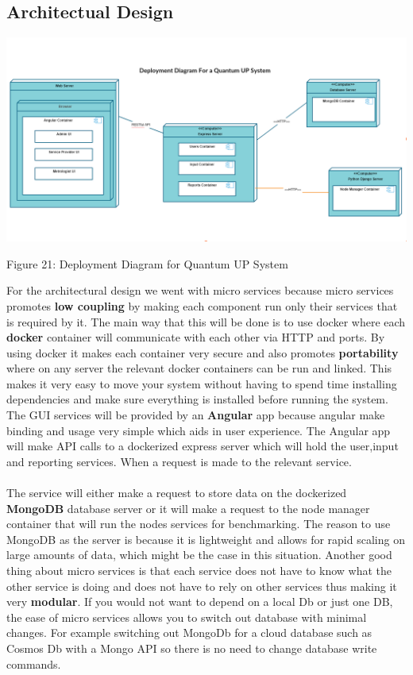 \subsection{Architectual Design}
\includegraphics[width=\textwidth]{deployment_diagram/Quantum_UP_Deployment_Diagram.png}
    \begin{center}
    	\small{Figure 21: Deployment Diagram for Quantum UP System}
    \end{center}

For the architectural design we went with micro services because micro services promotes \textbf{low coupling} by making each component run only their services that is required by it. The main way that this will be done is to use docker where each \textbf{docker} container will communicate with each other via HTTP and ports. By using docker it makes each container very secure and also promotes \textbf{portability} where on any server the relevant docker containers can be run and linked. This makes it very easy to move your system without having to spend time installing dependencies and make sure everything is installed before running the system. The GUI services will be provided by an \textbf{Angular} app because angular make binding and usage very simple which aids in user experience. The Angular app will make API calls to a dockerized express server which will hold the user,input and reporting services. When a request is made to the relevant service.\\ \\ 

The service will either make a request to store data on the dockerized \textbf{MongoDB} database server or it will make a request to the node manager container that will run the nodes services for benchmarking. The reason to use MongoDB as the server is because it is lightweight and allows for rapid scaling on large amounts of data, which might be the case in this situation. Another good thing about micro services is that each service does not have to know what the other service is doing and does not have to rely on other services thus making it very \textbf{modular}. If you would not want to depend on a local Db or just one DB, the ease of micro services allows you to switch out database with minimal changes. For example switching out MongoDb for a cloud database such as Cosmos Db with a Mongo API so there is no need to change database write commands.\\ \\

